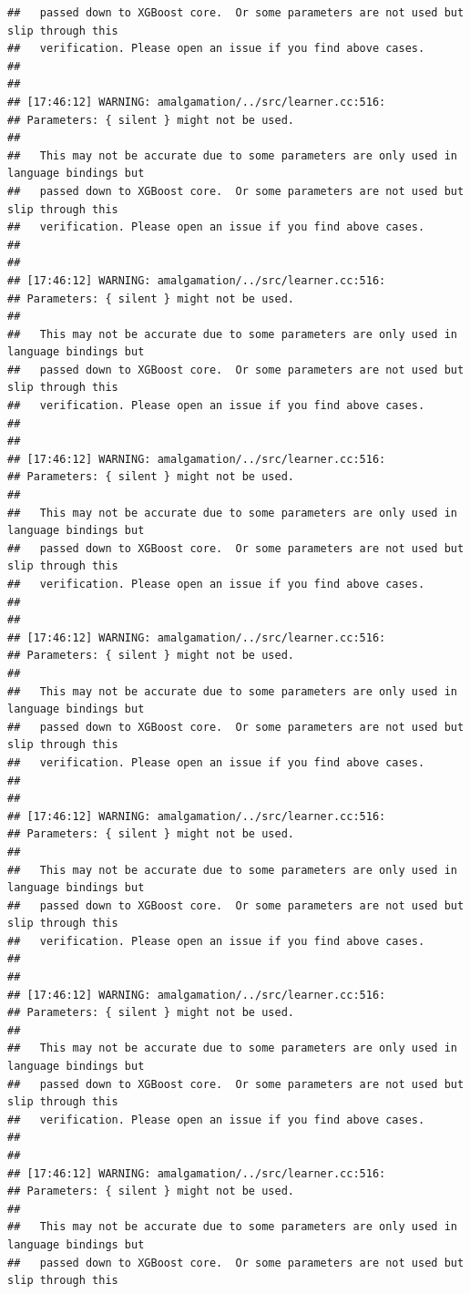 \documentclass[AMS,STIX2COL]{WileyNJD-v2}\usepackage[]{graphicx}\usepackage[]{color}
\makeatletter
\newenvironment{kframe}{%
 \def\at@end@of@kframe{}%
 \ifinner\ifhmode%
  \def\at@end@of@kframe{\end{minipage}}%
  \begin{minipage}{\columnwidth}%
 \fi\fi%
 \def\FrameCommand##1{\hskip\@totalleftmargin \hskip-\fboxsep
 \colorbox{shadecolor}{##1}\hskip-\fboxsep
     \hskip-\linewidth \hskip-\@totalleftmargin \hskip\columnwidth}%
 \MakeFramed {\advance\hsize-\width
   \@totalleftmargin\z@ \linewidth\hsize
   \@setminipage}}%
 {\par\unskip\endMakeFramed%
 \at@end@of@kframe}
\newenvironment{knitrout}{}{} %
\makeatother
\begin{document}
\begin{knitrout}
\begin{kframe}
\begin{verbatim}
##   passed down to XGBoost core.  Or some parameters are not used but slip through this
##   verification. Please open an issue if you find above cases.
## 
## 
## [17:46:12] WARNING: amalgamation/../src/learner.cc:516: 
## Parameters: { silent } might not be used.
## 
##   This may not be accurate due to some parameters are only used in language bindings but
##   passed down to XGBoost core.  Or some parameters are not used but slip through this
##   verification. Please open an issue if you find above cases.
## 
## 
## [17:46:12] WARNING: amalgamation/../src/learner.cc:516: 
## Parameters: { silent } might not be used.
## 
##   This may not be accurate due to some parameters are only used in language bindings but
##   passed down to XGBoost core.  Or some parameters are not used but slip through this
##   verification. Please open an issue if you find above cases.
## 
## 
## [17:46:12] WARNING: amalgamation/../src/learner.cc:516: 
## Parameters: { silent } might not be used.
## 
##   This may not be accurate due to some parameters are only used in language bindings but
##   passed down to XGBoost core.  Or some parameters are not used but slip through this
##   verification. Please open an issue if you find above cases.
## 
## 
## [17:46:12] WARNING: amalgamation/../src/learner.cc:516: 
## Parameters: { silent } might not be used.
## 
##   This may not be accurate due to some parameters are only used in language bindings but
##   passed down to XGBoost core.  Or some parameters are not used but slip through this
##   verification. Please open an issue if you find above cases.
## 
## 
## [17:46:12] WARNING: amalgamation/../src/learner.cc:516: 
## Parameters: { silent } might not be used.
## 
##   This may not be accurate due to some parameters are only used in language bindings but
##   passed down to XGBoost core.  Or some parameters are not used but slip through this
##   verification. Please open an issue if you find above cases.
## 
## 
## [17:46:12] WARNING: amalgamation/../src/learner.cc:516: 
## Parameters: { silent } might not be used.
## 
##   This may not be accurate due to some parameters are only used in language bindings but
##   passed down to XGBoost core.  Or some parameters are not used but slip through this
##   verification. Please open an issue if you find above cases.
## 
## 
## [17:46:12] WARNING: amalgamation/../src/learner.cc:516: 
## Parameters: { silent } might not be used.
## 
##   This may not be accurate due to some parameters are only used in language bindings but
##   passed down to XGBoost core.  Or some parameters are not used but slip through this

\end{verbatim}
\end{kframe}
\end{knitrout}
\end{document}
